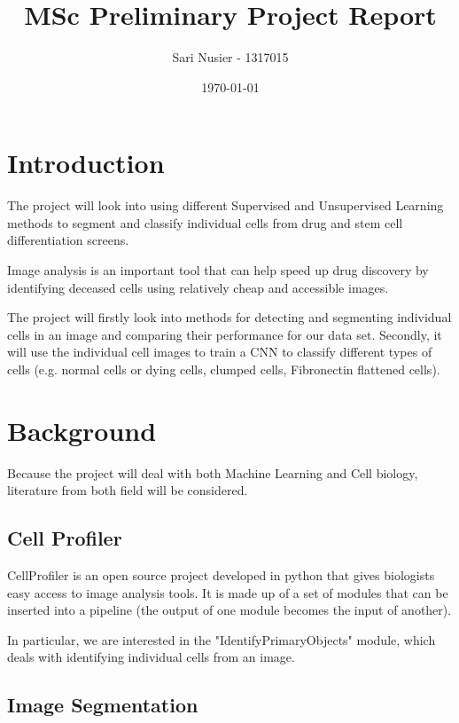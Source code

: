 \documentclass[12pt,a4paper]{article}
\begin{document}
\doublespacing
\begin{titlepage}
	\centering
	\title{MSc Preliminary Project Report}
	\author{Sari Nusier - 1317015}
	\date{\today}
	\maketitle
\end{titlepage}

\section{Introduction}

The project will look into using different Supervised and Unsupervised Learning methods to segment and classify individual cells from drug and stem cell differentiation screens.

Image analysis is an important tool that can help speed up drug discovery by identifying deceased cells using relatively cheap and accessible images. 

The project will firstly look into methods for detecting and segmenting individual cells in an image and comparing their performance for our data set. Secondly, it will use the individual cell images to train a CNN to classify different types of cells (e.g. normal cells or dying cells, clumped cells, Fibronectin flattened cells). 

\section{Background}
Because the project will deal with both Machine Learning and Cell biology, literature from both field will be considered.

\subsection{Cell Profiler}
CellProfiler \cite{cellprofiler} \cite{cellprofilerweb} is an open source project developed in python that gives biologists easy access to image analysis tools. It is made up of a set of modules that can be inserted into a pipeline (the output of one module becomes the input of another).

In particular, we are interested in the "IdentifyPrimaryObjects" module, which deals with identifying individual cells from an image. 

\subsection{Image Segmentation}
\end{document}
